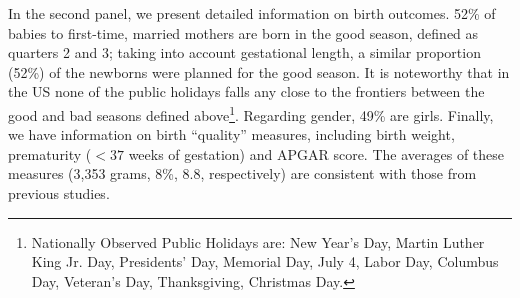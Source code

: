 \documentclass[a4paper, 12 pt]{article}
\theoremstyle{plain}
\begin{document}
\begin{doublespace}
In the second panel, we present detailed information on birth outcomes. 52\% of babies to first-time, married mothers are born in the good season, defined as quarters 2 and 3; taking into account gestational length, a similar proportion (52\%) of the newborns were planned for the good season. It is noteworthy that in the US none of the public holidays falls any close to the frontiers between the good and bad seasons defined above\footnote{Nationally Observed Public Holidays are: New Year's Day, Martin Luther King Jr. Day, Presidents' Day, Memorial Day, July 4, Labor Day, Columbus Day, Veteran's Day, Thanksgiving, Christmas Day.}. Regarding gender, 49\% are girls. Finally, we have information on birth ``quality'' measures, including birth weight, prematurity ($<37$ weeks of gestation) and APGAR score. The averages of these measures (3,353 grams, 8\%, 8.8, respectively) are consistent with those from previous studies.




\end{doublespace}
\end{document}
